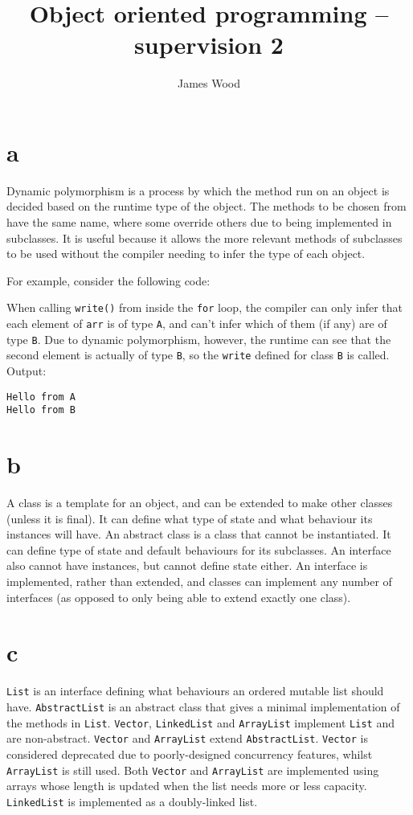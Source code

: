 \documentclass[11pt]{article}
\title{\textbf{Object oriented programming -- supervision 2}}
\author{James Wood}
\begin{document}
\maketitle

\section*{a}
Dynamic polymorphism is a process by which the method run on an object is decided based on the runtime type of the object. The methods to be chosen from have the same name, where some override others due to being implemented in subclasses. It is useful because it allows the more relevant methods of subclasses to be used without the compiler needing to infer the type of each object.

For example, consider the following code:



When calling \texttt{write()} from inside the \texttt{for} loop, the compiler can only infer that each element of \texttt{arr} is of type \texttt{A}, and can't infer which of them (if any) are of type \texttt{B}. Due to dynamic polymorphism, however, the runtime can see that the second element is actually of type \texttt{B}, so the \texttt{write} defined for class \texttt{B} is called. Output:

\begin{verbatim}
Hello from A
Hello from B
\end{verbatim}

\section*{b}
A class is a template for an object, and can be extended to make other classes (unless it is final). It can define what type of state and what behaviour its instances will have. An abstract class is a class that cannot be instantiated. It can define type of state and default behaviours for its subclasses. An interface also cannot have instances, but cannot define state either. An interface is implemented, rather than extended, and classes can implement any number of interfaces (as opposed to only being able to extend exactly one class).

\section*{c}
\texttt{List} is an interface defining what behaviours an ordered mutable list should have. \texttt{AbstractList} is an abstract class that gives a minimal implementation of the methods in \texttt{List}. \texttt{Vector}, \texttt{LinkedList} and \texttt{ArrayList} implement \texttt{List} and are non-abstract. \texttt{Vector} and \texttt{ArrayList} extend \texttt{AbstractList}. \texttt{Vector} is considered deprecated due to poorly-designed concurrency features, whilst \texttt{ArrayList} is still used. Both \texttt{Vector} and \texttt{ArrayList} are implemented using arrays whose length is updated when the list needs more or less capacity. \texttt{LinkedList} is implemented as a doubly-linked list.
\end{document}
